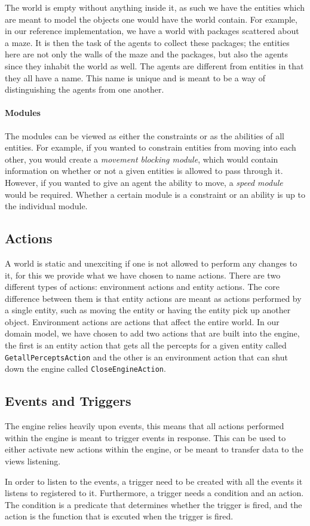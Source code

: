 The world is empty without anything inside it, as such we have the
entities which are meant to model the objects one would have the world
contain. For example, in our reference implementation, we have a world
with packages scattered about a maze. It is then the task of the agents
to collect these packages; the entities here are not only the walls
of the maze and the packages, but also the agents since they inhabit
the world as well. The agents are different from entities in that
they all have a name. This name is unique and is meant to be a way
of distinguishing the agents from one another. 


\paragraph*{Modules}

The modules can be viewed as either the constraints or as the abilities
of all entities. For example, if you wanted to constrain entities
from moving into each other, you would create a \emph{movement blocking
module}, which would contain information on whether or not a given
entities is allowed to pass through it. However, if you wanted to
give an agent the ability to move, a \emph{speed module} would be
required. Whether a certain module is a constraint or an ability is
up to the individual module.


\subsection{Actions}

A world is static and unexciting if one is not allowed to perform
any changes to it, for this we provide what we have chosen to name
actions. There are two different types of actions: environment actions
and entity actions. The core difference between them is that entity
actions are meant as actions performed by a single entity, such as
moving the entity or having the entity pick up another object. Environment
actions are actions that affect the entire world. In our domain model,
we have chosen to add two actions that are built into the engine,
the first is an entity action that gets all the percepts for a given
entity called \texttt{GetallPerceptsAction} and the other is an environment
action that can shut down the engine called \texttt{CloseEngineAction}. 


\subsection{Events and Triggers}

The engine relies heavily upon events, this means that all actions
performed within the engine is meant to trigger events in response.
This can be used to either activate new actions within the engine,
or be meant to transfer data to the views listening. 

In order to listen to the events, a trigger need to be created with
all the events it listens to registered to it. Furthermore, a trigger
needs a condition and an action. The condition is a predicate that
determines whether the trigger is fired, and the action is the function
that is excuted when the trigger is fired.
